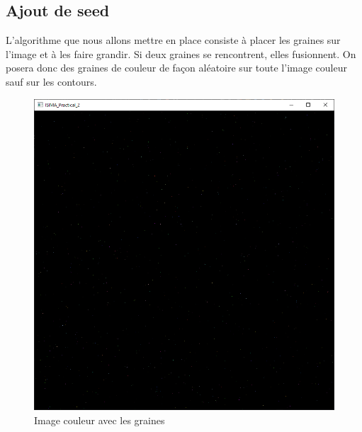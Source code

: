 \documentclass{article}
\begin{document}
\subsection{Ajout de seed}
L'algorithme que nous allons mettre en place consiste à placer les graines sur l'image et à les faire grandir. Si deux graines se rencontrent, elles fusionnent. On posera donc des graines de couleur de façon aléatoire sur toute l'image couleur sauf sur les contours.
\begin{figure}[H]
	\centering
	\includegraphics[scale=0.4]{images/bruit.png}
	\caption{Image couleur avec les graines}
\end{figure}
\end{document}
